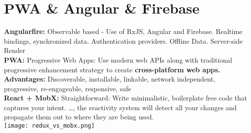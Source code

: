 
\section{PWA \& Angular \& Firebase}
\textcolor{b}{\textbf{Angularfire:}} Observable based - Use of RxJS, Angular and Firebase. Realtime bindings, synchronized data. Authentication providers. Offline Data. Server-side Render\\
\textcolor{b}{\textbf{PWA:}} Progressive Web Apps: Use modern web APIs along with traditional progressive enhancement strategy to create \textbf{cross-platform web apps.} \textbf{Advantages:} Discoverable, installable, linkable, network independent, progressive,
re-engageable, responsive, safe\\
\textcolor{b}{\textbf{React + MobX:}} Straightforward: Write minimalistic, boilerplate free code that captures your intent. …, the reactivity system will detect all your changes and propagate them out to where they are being used.\\
\texttt{[image: redux\_vs\_mobx.png]}